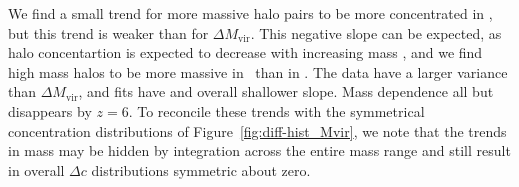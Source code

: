 We find a small trend for more massive halo pairs to be more concentrated in \za, but this trend is weaker than for $\Delta M_{\mathrm{vir}}$.  This negative slope can be expected, as halo concentartion is expected to decrease with increasing mass \citep{2001MNRAS.321..559B}, and we find high mass halos to be more massive in \lpt\ than in \za.  The data have a larger variance than $\Delta M_{\mathrm{vir}}$, and fits have and overall shallower slope.  Mass dependence all but disappears by $z = 6$.  To reconcile these trends with the symmetrical concentration distributions of Figure~\ref{fig:diff-hist_Mvir}, we note that the trends in mass may be hidden by integration across the entire mass range and still result in overall $\Delta c$ distributions symmetric about zero.




